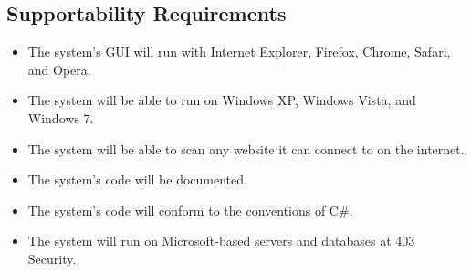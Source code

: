 \subsection{Supportability Requirements}
\begin{itemize}
\item {}The system's GUI will run with Internet Explorer, Firefox, Chrome, Safari, and Opera.
\item The system will be able to run on Windows XP, Windows Vista, and Windows 7.
\item The system will be able to scan any website it can connect to on the internet.
\item The system's code will be documented.
\item The system's code will conform to the conventions of C\#.
\item The system will run on Microsoft-based servers and databases at 403 Security.
\end{itemize}
